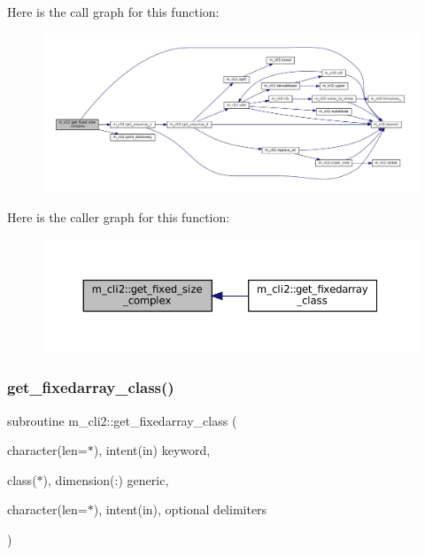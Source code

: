 Here is the call graph for this function\+:\nopagebreak
\begin{figure}[H]
\begin{center}
\leavevmode
\includegraphics[width=350pt]{namespacem__cli2_a32b78784e20e29bf40f17e16d08336fa_cgraph}
\end{center}
\end{figure}
Here is the caller graph for this function\+:\nopagebreak
\begin{figure}[H]
\begin{center}
\leavevmode
\includegraphics[width=350pt]{namespacem__cli2_a32b78784e20e29bf40f17e16d08336fa_icgraph}
\end{center}
\end{figure}
\mbox{\label{namespacem__cli2_a6d8c1c441ac15f9a2882e50459d39565}} 
\subsubsection{\texorpdfstring{get\+\_\+fixedarray\+\_\+class()}{get\_fixedarray\_class()}}
{\footnotesize\ttfamily subroutine m\+\_\+cli2\+::get\+\_\+fixedarray\+\_\+class (\begin{DoxyParamCaption}\item[{character(len=$\ast$), intent(in)}]{keyword,  }\item[{class($\ast$), dimension(\+:)}]{generic,  }\item[{character(len=$\ast$), intent(in), optional}]{delimiters }\end{DoxyParamCaption})\hspace{0.3cm}{\ttfamily [private]}}



